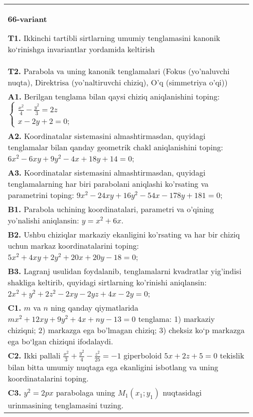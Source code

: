 \documentclass{article}
\begin{document}
\begin{tabular}{m{17cm}}
\textbf{66-variant}
\newline

\textbf{T1.} Ikkinchi tartibli sirtlarning umumiy tenglamasini kanonik ko‘rinishga invariantlar yordamida keltirish \\
\textbf{T2.} Parabola va uning kanonik tenglamalari (Fokus (yo’naluvchi nuqta), Direktrisa (yo’naltiruvchi chiziq), O’q (simmetriya o’qi)) \\
\textbf{A1.} Berilgan tenglama bilan qaysi chiziq aniqlanishini toping: $\left\{\begin{array}{l}\frac{x^2}{4}-\frac{y^2}{3}=2 z \\ x-2 y+2=0 ;\end{array}\right.$ \\
\textbf{A2.} Koordinatalar sistemasini almashtirmasdan, quyidagi tenglamalar bilan qanday geometrik chakl aniqlanishini toping: $6 x^2-6 x y+9 y^2-4 x+18 y+14=0$; \\
\textbf{A3.} Koordinatalar sistemasini almashtirmasdan, quyidagi tenglamalarning har biri parabolani aniqlashi ko'rsating va parametrini toping: $9 x^2-24 x y+16 y^2-54 x-178 y+181=0$; \\
\textbf{B1.} Parabola uchining koordinatalari, parametri va o'qining yo'nalishi aniqlansin: $y=x^2+6 x$. \\
\textbf{B2.} Ushbu chiziqlar markaziy ekanligini ko'rsating va har bir chiziq uchun markaz koordinatalarini toping: $5 x^2+4 x y+2 y^2+20 x+20 y-18=0$; \\
\textbf{B3.} Lagranj usulidan foydalanib, tenglamalarni kvadratlar yig'indisi shakliga keltirib, quyidagi sirtlarning ko'rinishi aniqlansin: $2 x^2+y^2+2 z^2-2 x y-2 y z+4 x-2 y=0$; \\
\textbf{C1.} $m$ va $n$ ning qanday qiymatlarida $m x^2+12 x y+9 y^2+4 x+n y-13=0$ tenglama: 1) markaziy chiziqni; 2) markazga ega bo'lmagan chiziq; 3) cheksiz ko‘p markazga ega bo‘lgan chiziqni ifodalaydi. \\
\textbf{C2.} Ikki pallali $\frac{x^2}{3}+\frac{y^2}{4}-\frac{z^2}{25}=-1$ giperboloid $5 x+2 z+5=0$ tekislik bilan bitta umumiy nuqtaga ega ekanligini isbotlang va uning koordinatalarini toping. \\
\textbf{C3.} $y^2=2 p x$ parabolaga uning $M_1\left(x_1; y_1\right) $ nuqtasidagi urinmasining tenglamasini tuzing. \\

\end{tabular}
\vspace{1cm}
\end{document}
